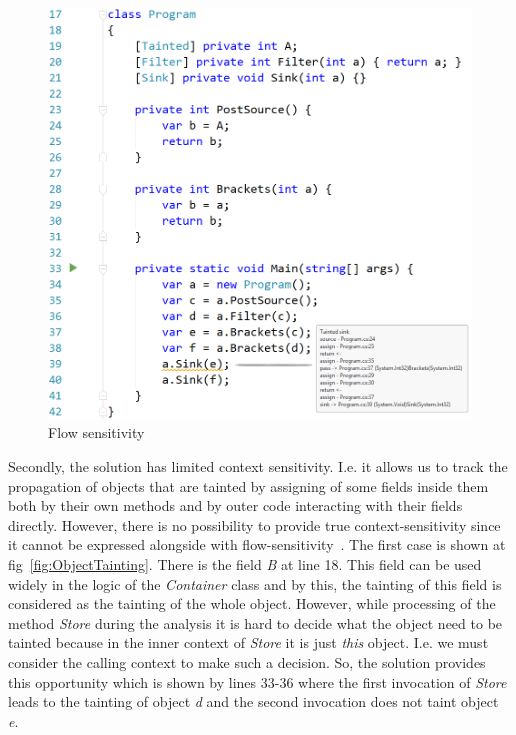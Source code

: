 \begin{figure}[h]
	\includegraphics[width=\linewidth]{screenshots/ReturnsAndBrackets.png}
	\caption{Flow sensitivity}
	\label{fig:ReturnsAndBrackets}
\end{figure}

Secondly, the solution has limited context sensitivity. I.e. it allows us to track the propagation of objects that are tainted by assigning of some fields inside them both by their own methods and by outer code interacting with their fields directly.
However, there is no possibility to provide true context-sensitivity since it cannot be expressed alongside with flow-sensitivity~\cite{Spath:2019:CFF:3302515.3290361}.
The first case is shown at fig~\ref{fig:ObjectTainting}.
There is the field \textit{B} at line 18.
This field can be used widely in the logic of the \textit{Container} class and by this, the tainting of this field is considered as the tainting of the whole object.
However, while processing of the method \textit{Store} during the analysis it is hard to decide what the object need to be tainted because in the inner context of \textit{Store} it is just \textit{this} object.
I.e. we must consider the calling context to make such a decision.
So, the solution provides this opportunity which is shown by lines 33-36 where the first invocation of \textit{Store} leads to the tainting of object \textit{d} and the second invocation does not taint object \textit{e}.


